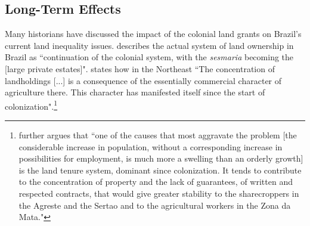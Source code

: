 \documentclass[11pt]{article}
\begin{document}






\subsection{Long-Term Effects}

Many historians have discussed the impact of the colonial land grants on Brazil's current land inequality issues.
\textcite[p.~18]{Andrade1980-zd} describes the actual system of land ownership in Brazil as ``continuation of the colonial system, with the \textit{sesmaria} becoming the [large private estates]".
\textcite[p.~36]{De_Oliveira_Andrade1980-xz} states how in the Northeast 
``The concentration of landholdings [...] is a consequence of the essentially commercial character of agriculture there. This character has manifested itself since the start of colonization".\footnote{\textcite[p.~34-35]{De_Oliveira_Andrade1980-xz} further argues that 
``one of the causes that most aggravate the problem [the considerable increase in population, without a corresponding increase in possibilities for employment, is much more a swelling than an orderly growth] is the land tenure system, dominant since colonization. It tends to contribute to the concentration of property and the lack of guarantees, of written and respected contracts, that would give greater stability to the sharecroppers in the Agreste and the Sertao and to the agricultural workers in the Zona da Mata."}
\end{document}
